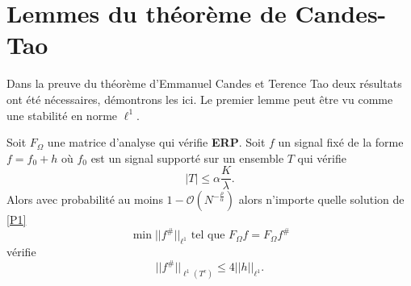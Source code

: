 \section{Lemmes du théorème de Candes-Tao}
Dans la preuve du théorème d'Emmanuel Candes et Terence Tao deux résultats ont été nécessaires, démontrons les ici.
Le premier lemme peut être vu comme une stabilité en norme $\ell^1$.
\begin{lemme}\label{th:tao1}
	Soit $F_\Omega$ une matrice d'analyse qui vérifie \textbf{ERP}. 
	Soit $f$ un signal fixé de la forme $f = f_0 + h$ où $f_0$ est un signal supporté sur un ensemble $T$ qui vérifie
	\begin{equation}
		|T|\leq \alpha \frac{K}{\lambda}.
	\end{equation}
	Alors avec probabilité au moins $1-\mathcal{O}(N^{-\frac{\rho}{\alpha}})$ alors n'importe quelle solution de \ref{P1} 
	\begin{equation}
		\min ||f^\#||_{\ell^1} \text{ tel que } F_\Omega f = F_\Omega f^\# 
	\end{equation}
	vérifie
	\begin{equation}
		||f^\#||_{\ell^1(T^c)} \leq 4||h||_{\ell^1}.
	\end{equation}
\end{lemme}
